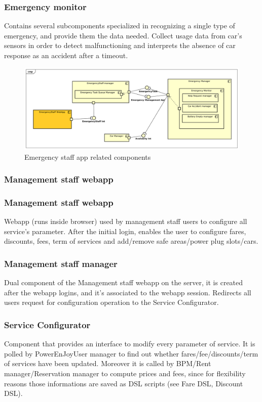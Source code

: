 \documentclass[english]{article}
\begin{document}
		\subsubsection{Emergency monitor}
		Contains several subcomponents specialized in recognizing a single type of emergency, and provide them the data needed. Collect usage data from car's sensors in order to detect malfunctioning and interprets the absence of car response as an accident after a timeout.  
	\begin{figure}[H]
		\centering
		\includegraphics[scale=0.35]{./ComponentDiagrams/EmergencyStaff.pdf}%
		\caption{Emergency staff app related components}
	\end{figure}
	
	
\subsubsection*{Management staff webapp}

	\subsubsection{Management staff webapp}
	Webapp (runs inside browser) used by management staff users to configure all service's parameter. After the initial login, enables the user to configure fares, discounts, fees, term of services and add/remove safe areas/power plug slots/cars.
	\subsubsection{Management staff manager}
	Dual component of the Management staff webapp on the server, it is created after the webapp logins, and it's associated to the webapp session. Redirects all users request for configuration operation to the Service Configurator.
	\subsubsection{Service Configurator}
	Component that provides an interface to modify every parameter of service. It is polled by PowerEnJoyUser manager to find out whether fares/fee/discounts/term of services have been updated. Moreover it is called by BPM/Rent manager/Reservation manager to compute prices and fees, since for flexibility reasons those informations are saved as DSL scripts (see Fare DSL, Discount DSL).
\end{document}
